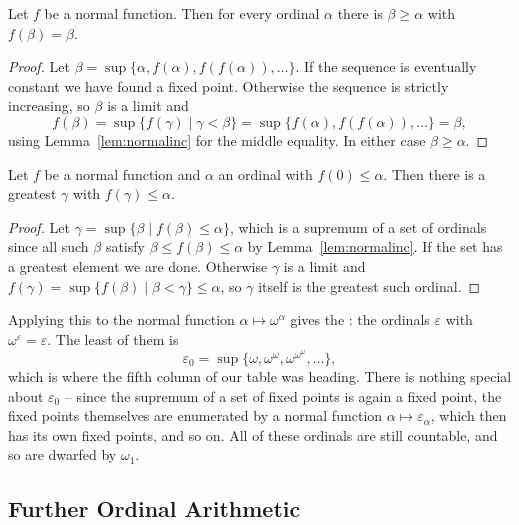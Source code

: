 \begin{lemma}\label{lem:fixedpoint}
  Let $f$ be a normal function. Then for every ordinal $\alpha$ there is $\beta \geq \alpha$ with $f(\beta) = \beta$.
\end{lemma}
\begin{proof}
  Let $\beta = \sup\{\alpha, f(\alpha), f(f(\alpha)), \dots\}$. If the sequence is eventually constant we have found a fixed point. Otherwise the sequence is strictly increasing, so $\beta$ is a limit and
  $$f(\beta) = \sup\{f(\gamma) \mid \gamma < \beta\} = \sup\{f(\alpha), f(f(\alpha)), \dots\} = \beta,$$
  using Lemma~\ref{lem:normalinc} for the middle equality. In either case $\beta \geq \alpha$.
\end{proof}

\begin{lemma}\label{lem:normaldivision}
  Let $f$ be a normal function and $\alpha$ an ordinal with $f(0) \leq \alpha$. Then there is a greatest $\gamma$ with $f(\gamma) \leq \alpha$.
\end{lemma}
\begin{proof}
  Let $\gamma = \sup\{\beta \mid f(\beta) \leq \alpha\}$, which is a supremum of a set of ordinals since all such $\beta$ satisfy $\beta \leq f(\beta) \leq \alpha$ by Lemma~\ref{lem:normalinc}. If the set has a greatest element we are done. Otherwise $\gamma$ is a limit and $f(\gamma) = \sup\{f(\beta) \mid \beta < \gamma\} \leq \alpha$, so $\gamma$ itself is the greatest such ordinal.
\end{proof}

Applying this to the normal function $\alpha \mapsto \omega^\alpha$ gives the : the ordinals $\varepsilon$ with $\omega^\varepsilon = \varepsilon$. The least of them is
$$\varepsilon_0 = \sup\{\omega, \omega^\omega, \omega^{\omega^\omega}, \dots\},$$
which is where the fifth column of our table was heading. There is nothing special about $\varepsilon_0$ -- since the supremum of a set of fixed points is again a fixed point, the fixed points themselves are enumerated by a normal function $\alpha \mapsto \varepsilon_\alpha$, which then has its own fixed points, and so on. All of these ordinals are still countable, and so are dwarfed by $\omega_1$.

\subsection{Further Ordinal Arithmetic}

